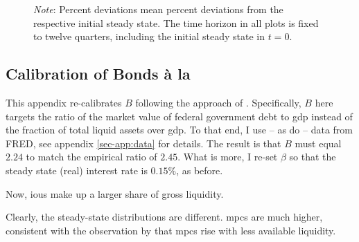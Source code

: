 \documentclass[a4paper,12pt]{article} %
\numberwithin{equation}{section} %
\numberwithin{figure}{section}
\numberwithin{table}{section}
\begin{document}
\begin{refsection}
\begin{appendices}
\begin{figure}[H]
     \vspace{10pt}
     
     \justifying
     \footnotesize
	\textit{Note}: Percent deviations mean percent deviations from the respective initial steady state. The time horizon in all plots is fixed to twelve quarters, including the initial steady state in $t=0$.
\end{figure}

\subsection{Calibration of Bonds à la \textcite{bayer2023}}
\label{sec-app:robust-bonds}

This appendix re-calibrates $B$ following the approach of \textcite{bayer2023}. Specifically, $B$ here targets the ratio of the market value of federal government debt to \Gls{gdp} instead of the fraction of total liquid assets over \Gls{gdp}. To that end, I use -- as \textcite{bayer2023} do -- data from FRED, see appendix \ref{sec-app:data} for details. The result is that $B$ must equal $2.24$ to match the empirical ratio of $2.45$. What is more, I re-set $\beta$ so that the steady state (real) interest rate is $0.15\%$, as before.

Now, \Gls{iou}s make up a larger share of gross liquidity. 

Clearly, the steady-state distributions are different. \Gls{mpc}s are much higher, consistent with the observation by \textcite{kaplan2018} that \Gls{mpc}s rise with less available liquidity.


\end{appendices}
\end{refsection}
\end{document}
